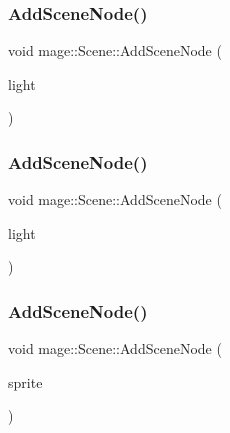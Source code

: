 \hypertarget{classmage_1_1_scene_acca52e00f0f8c35ec8d48979ac1255ab}{}\label{classmage_1_1_scene_acca52e00f0f8c35ec8d48979ac1255ab} 
\subsubsection{\texorpdfstring{Add\+Scene\+Node()}{AddSceneNode()}\hspace{0.1cm}{\footnotesize\ttfamily [5/7]}}
{\footnotesize\ttfamily void mage\+::\+Scene\+::\+Add\+Scene\+Node (\begin{DoxyParamCaption}\item[{\hyperlink{namespacemage_a1e01ae66713838a7a67d30e44c67703e}{Shared\+Ptr}$<$ \hyperlink{namespacemage_a1724c6e6b6b5ba535cdd967cbbb4a669}{Omni\+Light\+Node} $>$}]{light }\end{DoxyParamCaption})\hspace{0.3cm}{\ttfamily [private]}}

\hypertarget{classmage_1_1_scene_a52056b1b263c9ab070bc55af289edc3b}{}\label{classmage_1_1_scene_a52056b1b263c9ab070bc55af289edc3b} 
\subsubsection{\texorpdfstring{Add\+Scene\+Node()}{AddSceneNode()}\hspace{0.1cm}{\footnotesize\ttfamily [6/7]}}
{\footnotesize\ttfamily void mage\+::\+Scene\+::\+Add\+Scene\+Node (\begin{DoxyParamCaption}\item[{\hyperlink{namespacemage_a1e01ae66713838a7a67d30e44c67703e}{Shared\+Ptr}$<$ \hyperlink{namespacemage_aeed5dee4ff6c591eabb0e9114256df4a}{Spot\+Light\+Node} $>$}]{light }\end{DoxyParamCaption})\hspace{0.3cm}{\ttfamily [private]}}

\hypertarget{classmage_1_1_scene_ace55464eab55ec30359c0ea6587c2201}{}\label{classmage_1_1_scene_ace55464eab55ec30359c0ea6587c2201} 
\subsubsection{\texorpdfstring{Add\+Scene\+Node()}{AddSceneNode()}\hspace{0.1cm}{\footnotesize\ttfamily [7/7]}}
{\footnotesize\ttfamily void mage\+::\+Scene\+::\+Add\+Scene\+Node (\begin{DoxyParamCaption}\item[{\hyperlink{namespacemage_a1e01ae66713838a7a67d30e44c67703e}{Shared\+Ptr}$<$ \hyperlink{classmage_1_1_sprite_node}{Sprite\+Node} $>$}]{sprite }\end{DoxyParamCaption})\hspace{0.3cm}{\ttfamily [private]}}

